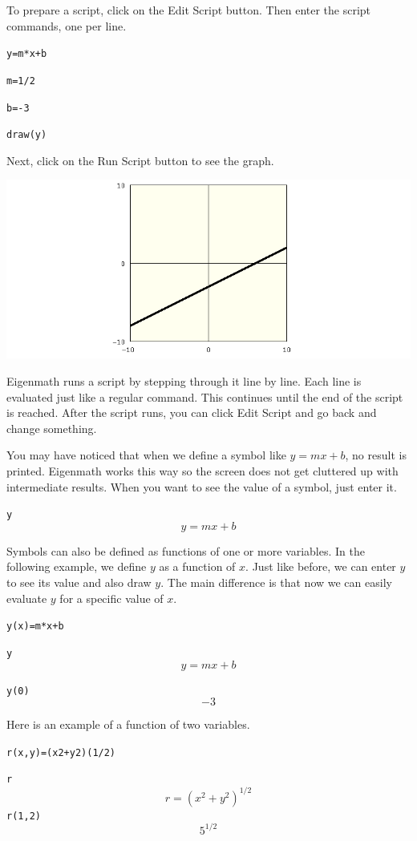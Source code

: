\documentclass[12pt,openany]{report}
\begin{document}
\medskip
\noindent
To prepare a script, click on the Edit Script button.
Then enter the script commands, one per line.

\medskip
{\tt y=m*x+b}

{\tt m=1/2}

{\tt b=-3}

{\tt draw(y)}

\medskip
\noindent
Next, click on the Run Script button to see the graph.

\medskip
\noindent
\includegraphics[scale=0.5]{1.png}

\medskip
\noindent
Eigenmath runs a script by stepping through it line by line.
Each line is evaluated just like a regular command.
This continues until the end of the script is reached.
After the script runs, you can click Edit Script and go back and change something.

\newpage

\noindent
You may have noticed that when we define a symbol
like $y=mx+b$, no result is printed.
Eigenmath works this way so the screen does not get cluttered
up with intermediate results.
When you want to see the value of a symbol, just enter it.

\medskip
{\tt y}
$$y=mx+b$$

\medskip
\noindent
Symbols can also be defined as functions of one or more variables.
In the following example, we define $y$ as a function of $x$.
Just like before, we can enter $y$ to see its value and
also draw $y$.
The main difference is that now we can easily evaluate $y$ for
a specific value of $x$.

\medskip
{\tt y(x)=m*x+b}\par
{\tt y}
$$y=mx+b$$\par
{\tt y(0)}
$$-3$$

\medskip
\noindent
Here is an example of a function of two variables.

\medskip
{\tt r(x,y)=(x{}2+y{}2){}(1/2)}\par
{\tt r}
$$r=(x^2+y^2)^{1/2}$$
\indent
{\tt r(1,2)}
$$5^{1/2}$$
\end{document}

